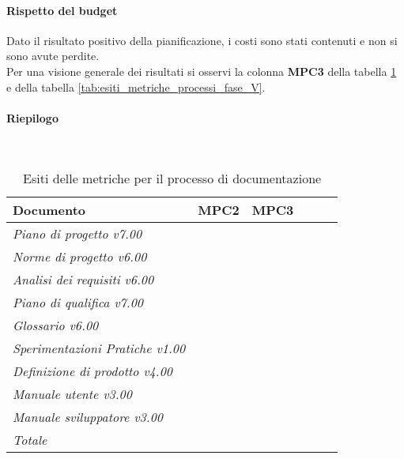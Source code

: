 \documentclass[../PianoDiQualifica.tex]{subfiles}
\begin{document}
\begin{appendices}
			\paragraph{Rispetto del budget}
			Dato il risultato positivo della pianificazione, i costi sono stati contenuti  e non si sono avute perdite.\\
			Per una visione generale dei risultati si osservi la colonna \textbf{MPC3}  della tabella \ref{tab:esiti_metriche_per_il_processo_di_documentazione_fase_V} e della tabella \ref{tab:esiti_metriche_processi_fase_V}.
			
			\paragraph{Riepilogo}\
			\begin{table}[H]
				\centering
				\begin{tabular}{l * {5}{c}}
					\toprule
					\textbf{Documento} & \textbf{MPC2} & \textbf{MPC3}\\
					\midrule
					\textit{Piano di progetto v7.00}  & \color{dkgreen}{0\%} & \color{dkgreen}{0\%} \\
					\textit{Norme di progetto v6.00}  & \color{dkgreen}{0\%} & \color{dkgreen}{0\%} \\
					\textit{Analisi dei requisiti v6.00}  & \color{dkgreen}{0\%} & \color{dkgreen}{0\%} \\
					\textit{Piano di qualifica v7.00}  & \color{dkgreen}{0\%} & \color{dkgreen}{0\%} \\
					\textit{Glossario v6.00}  & \color{dkgreen}{0\%} & \color{dkgreen}{0\%} \\
					\textit{Sperimentazioni Pratiche v1.00}  & \color{dkgreen}{0\%} & \color{dkgreen}{0\%} \\
					\textit{Definizione di prodotto v4.00}  & \color{dkgreen}{0\%} & \color{dkgreen}{0\%} \\
					\textit{Manuale utente v3.00}  & \color{dkgreen}{0\%} & \color{dkgreen}{0\%} \\
					\textit{Manuale sviluppatore v3.00}  & \color{dkgreen}{0\%} & \color{dkgreen}{0\%} \\
					\textit{Totale} & \color{dkgreen}{0\%} & \color{dkgreen}{0\%} \\
					\bottomrule
				\end{tabular}
				\caption{Esiti delle metriche per il processo di documentazione}
				\label{tab:esiti_metriche_per_il_processo_di_documentazione_fase_V}
			\end{table}
						

\end{appendices}
\end{document}
